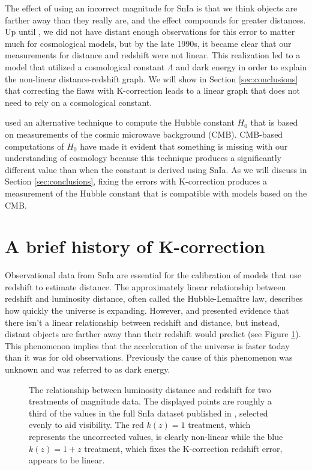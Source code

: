 \documentclass[linenumbers]{aastex631}
\begin{document}
The effect of using an incorrect magnitude for SnIa is that we think objects
are farther away than they really are, and the effect compounds for greater
distances. Up until \citet{riess1998}, we did not have distant enough
observations for this error to matter much for cosmological models, but by the
late 1990s, it became clear that our measurements for distance and redshift were
not linear. This realization led to a model that utilized a cosmological
constant $\Lambda$ and dark energy in order to explain the non-linear
distance-redshift graph. We will show in Section \ref{sec:conclusions} that
correcting the flaws with K-correction leads to a linear graph that does not
need to rely on a cosmological constant.

\citet{planck2015} used an alternative technique to compute the Hubble constant
$H_0$ that is based on measurements of the cosmic microwave background (CMB).
CMB-based computations of $H_0$ have made it evident that something is missing
with our understanding of cosmology because this technique produces a
significantly different value than when the constant is derived using SnIa.  As
we will discuss in Section \ref{sec:conclusions}, fixing the errors with
K-correction produces a measurement of the Hubble constant that is compatible
with models based on the CMB.

\section{A brief history of K-correction}
\label{sec:history}

Observational data from SnIa are essential for the calibration of models that
use redshift to estimate distance. The approximately linear relationship
between redshift and luminosity distance, often called the Hubble-Lema\^{i}tre law,
describes how quickly the universe is expanding. However, \citet{riess1998}
and \citet{perlmutter1999} presented evidence that there isn't a linear
relationship between redshift and distance, but instead, distant objects are
farther away than their redshift would predict (see Figure
\ref{fig:mu_distance_vs_redshift}). This phenomenon implies that the
acceleration of the universe is faster today than it was for old observations.
Previously the cause of this phenomenon was unknown and was referred to as dark
energy.

\begin{figure}
  \caption{The relationship between luminosity distance and redshift for two
  treatments of magnitude data. The displayed points are roughly a third of the
  values in the full SnIa dataset published in \citet{abbott2024}, selected
  evenly to aid visibility. The red $k(z) = 1$ treatment, which represents the
  uncorrected values, is clearly non-linear while the blue $k(z) = 1 + z$
  treatment, which fixes the K-correction redshift error, appears to be linear.}
  \label{fig:mu_distance_vs_redshift}
\end{figure}
\end{document}
